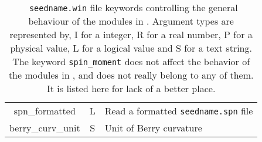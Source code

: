\begin{table}[h!]
\begin{center}
\begin{tabular}{|c|c|p{6cm}|}
{\sc spn\_formatted}  & L & 
  Read a formatted {\tt seedname.spn} file\\
  {\sc berry\_curv\_unit} & S & Unit of Berry curvature\\ 
 \hline
\end{tabular}
\caption[Parameter file keywords controlling \postw.]  {{\tt
    seedname.win} file keywords controlling the general behaviour of
  the modules in \postw. Argument types are represented by, I for a
  integer, R for a real number, P for a
  physical value, L for a logical value and S for a text string.\\
  The keyword {\tt spin\_moment} does not affect
    the behavior of the modules in \postw, and does not really belong
    to any of them. It is listed here for lack of a better place.}
\label{parameter_keywords_postw90}
\end{center}
\end{table}


